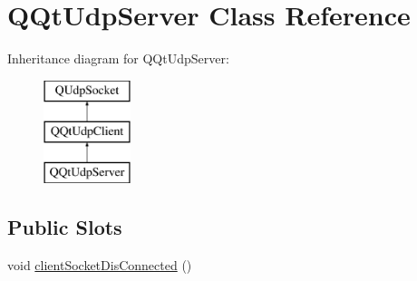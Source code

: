 \hypertarget{class_q_qt_udp_server}{}\section{Q\+Qt\+Udp\+Server Class Reference}
\label{class_q_qt_udp_server}
Inheritance diagram for Q\+Qt\+Udp\+Server\+:\begin{figure}[H]
\begin{center}
\leavevmode
\includegraphics[height=3.000000cm]{class_q_qt_udp_server}
\end{center}
\end{figure}
\subsection*{Public Slots}
\begin{DoxyCompactItemize}
\item 
void \mbox{\hyperlink{class_q_qt_udp_server_a211ac52377f5a841ea470f129b31c287}{client\+Socket\+Dis\+Connected}} ()
\end{DoxyCompactItemize}
